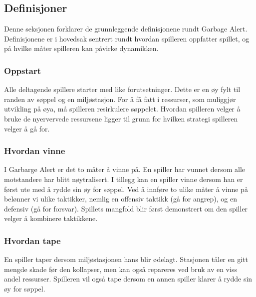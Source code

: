 \subsection{Definisjoner}
Denne seksjonen forklarer de grunnleggende definisjonene rundt Garbage
Alert. Definisjonene er i hovedsak sentrert rundt hvordan spilleren
oppfatter spillet, og på hvilke måter spilleren kan påvirke dynamikken.
\subsubsection{Oppstart}
Alle deltagende spillere starter med like forutsetninger. Dette er en øy
fylt til randen av søppel og en miljøstasjon. For å få fatt i ressurser, 
som muliggjør utvikling på øya, må spilleren resirkulere søppelet.  Hvordan
spilleren velger å bruke de nyervervede ressursene ligger til grunn for
hvilken strategi spilleren velger å gå for.
\subsubsection{Hvordan vinne}
I Garbarge Alert er det to måter å vinne på. En spiller har vunnet
dersom alle motstandere har blitt nøytralisert. I tillegg kan en spiller
vinne dersom han er først ute med å rydde sin øy for søppel.  Ved å
innføre to ulike måter å vinne på belønner vi ulike taktikker, nemlig en offensiv
taktikk (gå for angrep), og en defensiv (gå for forsvar).  Spillets
mangfold blir først demonstrert om den spiller velger å kombinere
taktikkene.
\subsubsection{Hvordan tape}
En spiller taper dersom miljøstasjonen hans blir ødelagt. Stasjonen
tåler en gitt mengde skade før den kollapser, men kan også repareres ved 
bruk av en viss andel ressurser.
Spilleren vil også tape dersom en annen spiller klarer å rydde sin øy
for søppel.
